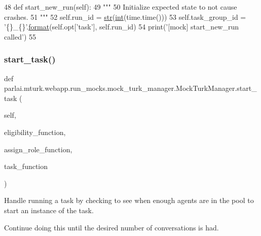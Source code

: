 \begin{DoxyCode}
48     \textcolor{keyword}{def }start\_new\_run(self):
49         \textcolor{stringliteral}{"""}
50 \textcolor{stringliteral}{        Initialize expected state to not cause crashes.}
51 \textcolor{stringliteral}{        """}
52         self.run\_id = \hyperlink{namespacegenerate__task__READMEs_a5b88452ffb87b78c8c85ececebafc09f}{str}(\hyperlink{namespacelanguage__model_1_1eval__ppl_a7d12ee00479673c5c8d1f6d01faa272a}{int}(time.time()))
53         self.task\_group\_id = \textcolor{stringliteral}{'\{\}\_\{\}'}.\hyperlink{namespaceparlai_1_1chat__service_1_1services_1_1messenger_1_1shared__utils_a32e2e2022b824fbaf80c747160b52a76}{format}(self.opt[\textcolor{stringliteral}{'task'}], self.run\_id)
54         print(\textcolor{stringliteral}{'[mock] start\_new\_run called'})
55 
\end{DoxyCode}
\mbox{\label{classparlai_1_1mturk_1_1webapp_1_1run__mocks_1_1mock__turk__manager_1_1MockTurkManager_aaf3ea17684e3684dea2850c077b218e6}} 
\subsubsection{\texorpdfstring{start\+\_\+task()}{start\_task()}}
{\footnotesize\ttfamily def parlai.\+mturk.\+webapp.\+run\+\_\+mocks.\+mock\+\_\+turk\+\_\+manager.\+Mock\+Turk\+Manager.\+start\+\_\+task (\begin{DoxyParamCaption}\item[{}]{self,  }\item[{}]{eligibility\+\_\+function,  }\item[{}]{assign\+\_\+role\+\_\+function,  }\item[{}]{task\+\_\+function }\end{DoxyParamCaption})}

\begin{DoxyVerb}Handle running a task by checking to see when enough agents are in the pool to
start an instance of the task.

Continue doing this until the desired number of conversations is had.
\end{DoxyVerb}
 

